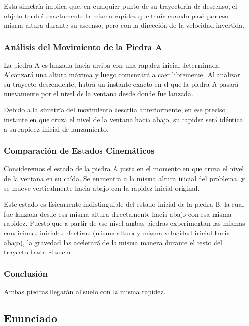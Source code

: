 \documentclass[12pt, a4paper]{article}
\begin{document}
Esta simetría implica que, en cualquier punto de su trayectoria de descenso, el objeto tendrá exactamente la misma rapidez que tenía cuando pasó por esa misma altura durante su ascenso, pero con la dirección de la velocidad invertida.

\subsubsection*{Análisis del Movimiento de la Piedra A}

La piedra A es lanzada hacia arriba con una rapidez inicial determinada. Alcanzará una altura máxima y luego comenzará a caer libremente. Al analizar su trayecto descendente, habrá un instante exacto en el que la piedra A pasará nuevamente por el nivel de la ventana desde donde fue lanzada. 

Debido a la simetría del movimiento descrita anteriormente, en ese preciso instante en que cruza el nivel de la ventana hacia abajo, su rapidez será idéntica a su rapidez inicial de lanzamiento.

\subsubsection*{Comparación de Estados Cinemáticos}

Consideremos el estado de la piedra A justo en el momento en que cruza el nivel de la ventana en su caída. Se encuentra a la misma altura inicial del problema, y se mueve verticalmente hacia abajo con la rapidez inicial original. 

Este estado es físicamente indistinguible del estado inicial de la piedra B, la cual fue lanzada desde esa misma altura directamente hacia abajo con esa misma rapidez. Puesto que a partir de ese nivel ambas piedras experimentan las mismas condiciones iniciales efectivas (misma altura y misma velocidad inicial hacia abajo), la gravedad las acelerará de la misma manera durante el resto del trayecto hasta el suelo.

\subsubsection*{Conclusión}

Ambas piedras llegarán al suelo con la misma rapidez.

\newpage

\subsection*{Enunciado}
\end{document}
